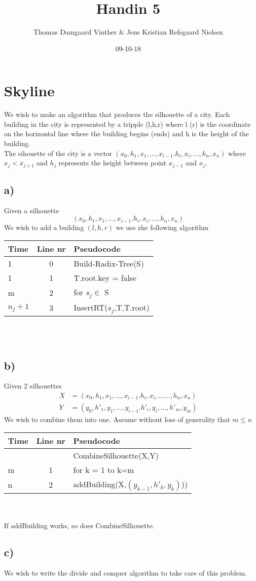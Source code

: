 \documentclass{article}
\theoremstyle{remark}
\numberwithin{equation}{section}
\begin{document}
	\author{Thomas Damgaard Vinther \& Jens Kristian Refsgaard Nielsen}
	\title{Handin 5}
	\date{09-10-18}
	\maketitle
\section{Skyline}
We wish to make an algorithm that produces the silhouette of a city. Each building in the city is represented by a tripple (l,h,r) where l (r) is the coordinate on the horizontal line where the building begins (ends) and h is the height of the building.
\\The sihouette of the city is a vector $(x_0,h_1,x_1,\dots,x_{i-1}.h_i,x_i,\dots,h_n,x_n)$ where $x_j<x_{j+1}$ and $h_j$ represents the height between point $x_{j-1}$ and $x_j$.
\subsection{a)}
Given a silhouette
\begin{equation}
	(x_0,h_1,x_1,\dots,x_{i-1}.h_i,x_i,\dots,h_n,x_n)
\end{equation}
We wish to add a building $(l,h,r)$ we use zhe following algorithm\\
\begin{tabular}{l | c | l}
	Time & Line nr & Pseudocode \\ \hline
	1&0&Build-Radix-Tree(S)\\
	1 & 1 & T.root.key = false\\
	m & 2 & for $s_j \in$ S\\
	\indent $n_j+1$ & 3 &\indent InsertRT($s_j$,T,T.root)\\
\end{tabular}\\\\
\subsection{b)}
Given 2 silhouettes
\begin{align}
	X&=(x_0,h_1,x_1,\dots,x_{i-1}.h_i,x_i,\dots\dots,h_n,x_n)\\
	Y&=(y_0,h'_1,y_1,\dots,y_{i-1}.h'_i,y_i,\dots,h'_m,y_m)
\end{align}
We wish to combine them into one. Assume without loss of generality that $m\leq n$\\
\begin{tabular}{l | c | l}
	Time & Line nr & Pseudocode \\ \hline
	&&CombineSilhouette(X,Y)\\
	m & 1 & for k = 1 to k=m\\
	\indent n & 2 & \indent addBuilding(X,$(y_{k-1},h'_k,y_k)$))\\
\end{tabular}\\\\
If addBuilding works, so does CombineSilhouette.
\subsection{c)}
We wish to write the divide and conquer algorithm to take care of this problem.
\end{document}
